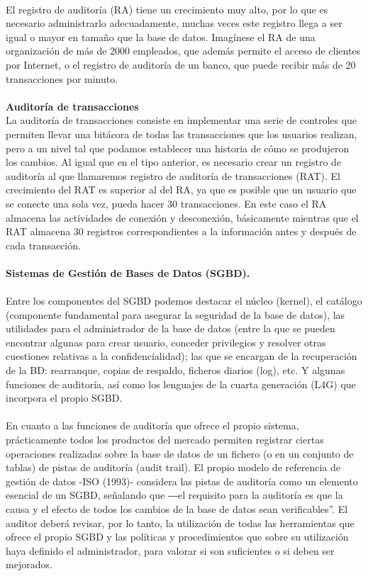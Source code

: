 \documentclass[twoside,twocolumn]{article}
\begin{document}
\begin{flushright}
\begin{itemize}
\textbf{}\\
 El registro de auditoría (RA) tiene un
crecimiento muy alto, por lo que es necesario
administrarlo adecuadamente, muchas veces este
registro llega a ser igual o mayor en tamaño que la
base de datos. Imagínese el RA de una organización
de más de 2000 empleados, que además permite
el acceso de clientes por Internet, o el registro de
auditoría de un banco, que puede recibir más de 20
transacciones por minuto. 
\textbf{}\\
\textbf{}\\
\textbf{Auditoría de transacciones}\\
La auditoría de transacciones consiste en
implementar una serie de controles que permiten
llevar una bitácora de todas las transacciones que los
usuarios realizan, pero a un nivel tal que podamos
establecer una historia de cómo se produjeron los
cambios. Al igual que en el tipo anterior, es necesario
crear un registro de auditoría al que llamaremos
registro de auditoría de transacciones (RAT). El
crecimiento del RAT es superior al del RA, ya que
es posible que un usuario que se conecte una sola
vez, pueda hacer 30 transacciones. En este caso el
RA almacena las actividades de conexión y desconexión, básicamente mientras que el RAT almacena
30 registros correspondientes a la información antes
y después de cada transacción.
\textbf{}\\
\textbf{}\\
\textbf{Sistemas de Gestión de Bases de Datos (SGBD).}\\
\textbf{}\\
Entre los componentes del SGBD podemos destacar el núcleo (kernel), el catálogo (componente fundamental para asegurar la seguridad de la base de datos), las utilidades para el administrador de la base de datos (entre la que se pueden encontrar algunas para crear usuario, conceder privilegios y resolver otras cuestiones relativas a la confidencialidad); las que se encargan de la recuperación de la BD: rearranque, copias de respaldo, ficheros diarios (log), etc. Y algunas funciones de auditoría, así como los lenguajes de la cuarta generación (L4G) que incorpora el propio SGBD.\textbf{}\\
\textbf{}\\
En cuanto a las funciones de auditoría que ofrece el propio sistema, prácticamente todos los productos del mercado permiten registrar ciertas operaciones realizadas sobre la base de datos de un fichero (o en un conjunto de tablas) de pistas de auditoría (audit trail). El propio modelo de referencia de gestión de datos -ISO (1993)- considera las pistas de auditoría como un elemento esencial de un SGBD, señalando que ―el requisito para la auditoría es que la causa y el efecto de todos los cambios de la base de datos sean verificables”. El auditor deberá revisar, por lo tanto, la utilización de todas las herramientas que ofrece el propio SGBD y las políticas y procedimientos que sobre su utilización haya definido el administrador, para valorar si son suficientes o si deben ser mejorados.



\end{itemize}
\end{flushright}
\end{document}
